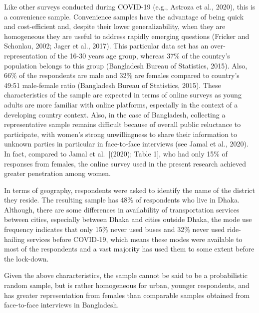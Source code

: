 \documentclass[]{elsarticle} %
\begin{document}
Like other surveys conducted during COVID-19 (e.g., Astroza et al.,
2020), this is a convenience sample. Convenience samples have the
advantage of being quick and cost-efficient and, despite their lower
generalizability, when they are homogeneous they are useful to address
rapidly emerging questions (Fricker and Schonlau, 2002; Jager et al.,
2017). This particular data set has an over-representation of the 16-30
years age group, whereas 37\% of the country's population belongs to
this group (Bangladesh Bureau of Statistics, 2015). Also, 66\% of the
respondents are male and 32\% are females compared to country's 49:51
male-female ratio (Bangladesh Bureau of Statistics, 2015). These
characteristics of the sample are expected in terms of online surveys as
young adults are more familiar with online platforms, especially in the
context of a developing country context. Also, in the case of
Bangladesh, collecting a representative sample remains difficult because
of overall public reluctance to participate, with women's strong
unwillingness to share their information to unknown parties in
particular in face-to-face interviews (see Jamal et al., 2020). In fact,
compared to Jamal et al.~{[}(2020); Table 1{]}, who had only 15\% of
responses from females, the online survey used in the present research
achieved greater penetration among women.

In terms of geography, respondents were asked to identify the name of
the district they reside. The resulting sample has 48\% of respondents
who live in Dhaka. Although, there are some differences in availability
of transportation services between cities, especially between Dhaka and
cities outside Dhaka, the mode use frequency indicates that only 15\%
never used buses and 32\% never used ride-hailing services before
COVID-19, which means these modes were available to most of the
respondents and a vast majority has used them to some extent before the
lock-down.

Given the above characteristics, the sample cannot be said to be a
probabilistic random sample, but is rather homogeneous for urban,
younger respondents, and has greater representation from females than
comparable samples obtained from face-to-face interviews in Bangladesh.
\end{document}
